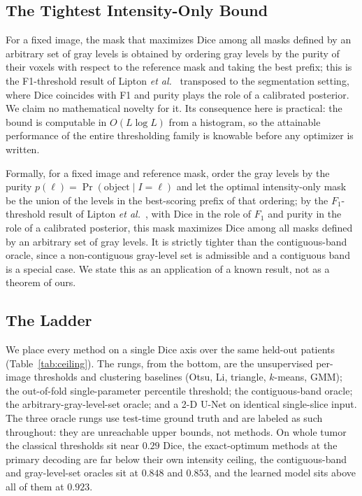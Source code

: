 \subsection{The Tightest Intensity-Only Bound}

For a fixed image, the mask that maximizes Dice among all masks defined by an
arbitrary set of gray levels is obtained by ordering gray levels by the purity
of their voxels with respect to the reference mask and taking the best prefix;
this is the F1-threshold result of Lipton \emph{et al.}~\cite{lipton_f1}
transposed to the segmentation setting, where Dice coincides with F1 and purity
plays the role of a calibrated posterior. We claim no mathematical novelty for
it. Its consequence here is practical: the bound is computable in $O(L \log L)$
from a histogram, so the attainable performance of the entire thresholding
family is knowable before any optimizer is written.

Formally, for a fixed image and reference mask, order the gray levels by the
purity $p(\ell)=\Pr(\text{object}\mid I=\ell)$ and let the optimal intensity-only
mask be the union of the levels in the best-scoring prefix of that ordering; by
the $F_1$-threshold result of Lipton \emph{et al.}~\cite{lipton_f1}, with Dice
in the role of $F_1$ and purity in the role of a calibrated posterior, this mask
maximizes Dice among all masks defined by an arbitrary set of gray levels. It is
strictly tighter than the contiguous-band oracle, since a non-contiguous
gray-level set is admissible and a contiguous band is a special case. We state
this as an application of a known result, not as a theorem of ours.

\subsection{The Ladder}

We place every method on a single Dice axis over the same held-out patients
(Table~\ref{tab:ceiling}). The rungs, from the bottom, are the unsupervised
per-image thresholds and clustering baselines (Otsu, Li, triangle, $k$-means,
GMM); the out-of-fold single-parameter percentile threshold; the contiguous-band
oracle; the arbitrary-gray-level-set oracle; and a 2-D U-Net on identical
single-slice input. The three oracle rungs use test-time ground truth and are
labeled as such throughout: they are unreachable upper bounds, not methods. On
whole tumor the classical thresholds sit near $0.29$ Dice, the exact-optimum
methods at the primary decoding are far below their own intensity ceiling, the
contiguous-band and gray-level-set oracles sit at $0.848$ and $0.853$, and the
learned model sits above all of them at $0.923$.

